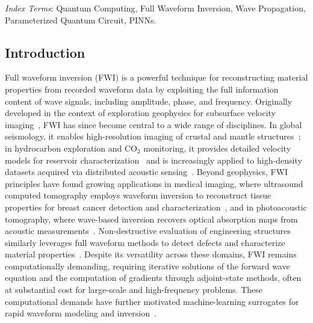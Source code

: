 \emph{Index Terms}: Quantum Computing, Full Waveform Inversion, Wave Propagation, Parameterized Quantum Circuit, PINNs.

\subsection{Introduction}

Full waveform inversion (FWI) is a powerful technique for reconstructing material properties from recorded waveform data by exploiting the full information content of wave signals, including amplitude, phase, and frequency. Originally developed in the context of exploration geophysics for subsurface velocity imaging~\cite{Tarantola1984}, FWI has since become central to a wide range of disciplines. In global seismology, it enables high-resolution imaging of crustal and mantle structures~\cite{Fichtner2009, Ebru2011}; in hydrocarbon exploration and CO$_2$ monitoring, it provides detailed velocity models for reservoir characterization~\cite{Virieux2009} and is increasingly applied to high-density datasets acquired via distributed acoustic sensing~\cite{Zhan2020}. Beyond geophysics, FWI principles have found growing applications in medical imaging, where ultrasound computed tomography employs waveform inversion to reconstruct tissue properties for breast cancer detection and characterization~\cite{10.1121/1.3699240, Sandhu_2015}, and in photoacoustic tomography, where wave-based inversion recovers optical absorption maps from acoustic measurements~\cite{Wang2016}. Non-destructive evaluation of engineering structures similarly leverages full waveform methods to detect defects and characterize material properties~\cite{7422116}. Despite its versatility across these domains, FWI remains computationally demanding, requiring iterative solutions of the forward wave equation and the computation of gradients through adjoint-state methods, often at substantial cost for large-scale and high-frequency problems. These computational demands have further motivated machine-learning surrogates for rapid waveform modeling and inversion~\cite{10091544}.

